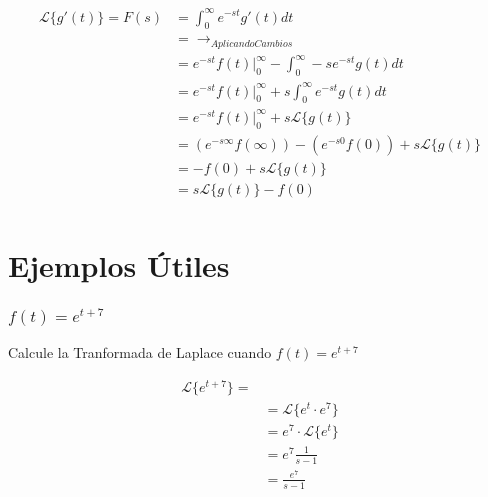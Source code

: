 \documentclass[12pt]{report}                                    %
\begin{document}
            \begin{equation*}   
            \begin{split}
                    \mathscr{L}\{g'(t)\} = F(s) 
                            & = \int_0^\infty e^{-st} g'(t) dt                                      \\
                            & = \to_{Aplicando Cambios}                                             \\
                            & = e^{-st} f(t)|_0^\infty - \int_0^\infty -se^{-st} g(t) dt            \\
                            & = e^{-st} f(t)|_0^\infty + s\int_0^\infty e^{-st} g(t) dt             \\
                            & = e^{-st} f(t)|_0^\infty + s\mathscr{L}\{g(t)\}                       \\
                            & = (e^{-s\infty} f(\infty))-(e^{-s0} f(0)) + s\mathscr{L}\{g(t)\}      \\
                            & = -f(0) + s\mathscr{L}\{g(t)\}                                        \\
                            & = s\mathscr{L}\{g(t)\} -f(0)                                          \\
            \end{split}
            \end{equation*}

    \clearpage
    \section{Ejemplos Útiles}

        \subsubsection{$f(t) = e^{t+7}$}
            Calcule la Tranformada de Laplace cuando $f(t) = e^{t+7}$

            \begin{equation*}   
            \begin{split}
                \mathscr{L}\{e^{t+7}\}  =                                                       \\
                            & = \mathscr{L} \{ e^t \cdot e^7 \}                                 \\
                            & = e^7 \cdot \mathscr{L} \{ e^t \}                                 \\
                            & = e^7 \frac{1}{s-1}                                               \\
                            & = \frac{e^7}{s-1}                                                 \\
            \end{split}
            \end{equation*}
\end{document}

